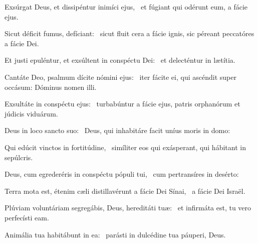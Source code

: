 \item Exsúrgat Deus, et dissipéntur inimíci ejus,~\psstar{} et fúgiant qui odérunt eum, a fácie ejus.

\item Sicut déficit fumus, defíciant:~\psstar{} sicut fluit cera a fácie ignis, sic péreant peccatóres a fácie Dei.

\item Et justi epuléntur, et exsúltent in conspéctu Dei:~\psstar{} et delecténtur in lætítia.

\item Cantáte Deo, psalmum dícite nómini ejus:~\psstar{} iter fácite ei, qui ascéndit super occásum: Dóminus nomen illi.

\item Exsultáte in conspéctu ejus:~\psstar{} turbabúntur a fácie ejus, patris orphanórum et júdicis viduárum.

\item Deus in loco sancto suo:~\psstar{} Deus, qui inhabitáre facit uníus moris in domo:

\item Qui edúcit vinctos in fortitúdine,~\psstar{} simíliter eos qui exásperant, qui hábitant in sepúlcris.

\item Deus, cum egrederéris in conspéctu pópuli tui,~\psstar{} cum pertransíres in desérto:

\item Terra mota est, étenim cæli distillavérunt a fácie Dei Sínai,~\psstar{} a fácie Dei Israël.

\item Plúviam voluntáriam segregábis, Deus, hereditáti tuæ:~\psstar{} et infirmáta est, tu vero perfecísti eam.

\item Animália tua habitábunt in ea:~\psstar{} parásti in dulcédine tua páuperi, Deus.
